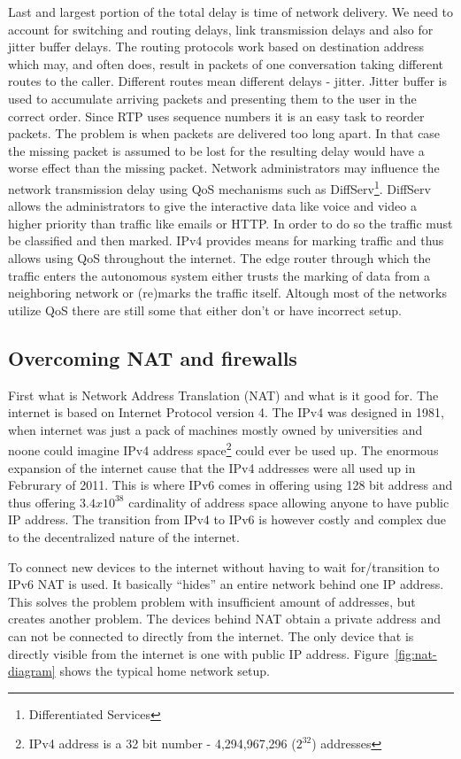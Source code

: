 Last and largest portion of the total delay is time of network delivery. We need to account for switching and routing delays, link transmission delays and also for jitter buffer delays. The routing protocols work based on destination address which may, and often does, result in packets of one conversation taking different routes to the caller. Different routes mean different delays - jitter. Jitter buffer is used to accumulate arriving packets and presenting them to the user in the correct order. Since RTP uses sequence numbers it is an easy task to reorder packets. The problem is when packets are delivered too long apart. In that case the missing packet is assumed to be lost for the resulting delay would have a worse effect than the missing packet. Network administrators may influence the network transmission delay using QoS mechanisms such as DiffServ\footnote{Differentiated Services}. DiffServ allows the administrators to give the interactive data like voice and video a higher priority than traffic like emails or HTTP. In order to do so the traffic must be classified and then marked. IPv4 provides means for marking traffic and thus allows using QoS throughout the internet. The edge router through which the traffic enters the autonomous system either trusts the marking of data from a neighboring network or (re)marks the traffic itself. Altough most of the networks utilize QoS there are still some that either don't or have incorrect setup.  

\subsection*{Overcoming NAT and firewalls}
First what is Network Address Translation (NAT) and what is it good for. The internet is based on Internet Protocol version 4. The IPv4 was designed in 1981, when internet was just a pack of machines mostly owned by universities and noone could imagine IPv4 address space\footnote{IPv4 address is a 32 bit number - 4,294,967,296 ($2^{32}$) addresses} could ever be used up. The enormous expansion of the internet cause that the IPv4 addresses were all used up in Februrary of 2011\cite{ianaAddressSpaceReport}. This is where IPv6 comes in offering using 128 bit address and thus offering $3.4x10^{38}$ cardinality of address space allowing anyone to have public IP address. The transition from IPv4 to IPv6 is however costly and complex due to the decentralized nature of the internet.  

To connect new devices to the internet without having to wait for/transition to IPv6 NAT is used. It basically ``hides'' an entire network behind one IP address. This solves the problem problem with insufficient amount of addresses, but creates another problem. The devices behind NAT obtain a private address and can not be connected to directly from the internet. The only device that is directly visible from the internet is one with public IP address. Figure~\ref{fig:nat-diagram} shows the typical home network setup. 

